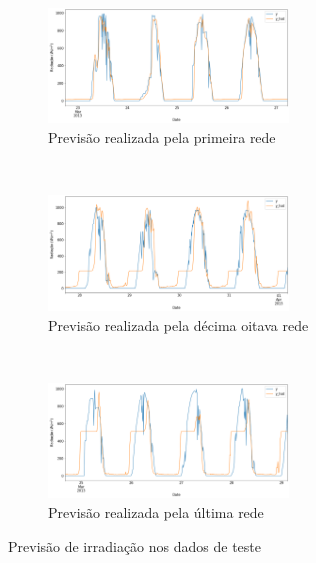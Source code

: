 
\begin{figure}[H]
	\centering
	\begin{subfigure}{\textwidth}
		\centering
		\includegraphics[width=0.7\textwidth]{../img/solar_pred_3m_0.png}
		\caption{Previsão realizada pela primeira rede}\label{fig:solar:pred1}
	\end{subfigure}
	\\ \vspace{1cm}
	\begin{subfigure}{\textwidth}
		\centering
		\includegraphics[width=0.7\textwidth]{../img/solar_pred_3m_18.png}
		\caption{Previsão realizada pela décima oitava rede}\label{fig:solar:pred18}
	\end{subfigure}
	\\ \vspace{1cm}
	\begin{subfigure}{\textwidth}
		\centering
		\includegraphics[width=0.7\textwidth]{../img/solar_pred_3m_-1.png}
		\caption{Previsão realizada pela última rede}\label{fig:solar:pred-1}
	\end{subfigure}
	\caption{Previsão de irradiação nos dados de teste}\label{fig:solar:pred}
\end{figure}
